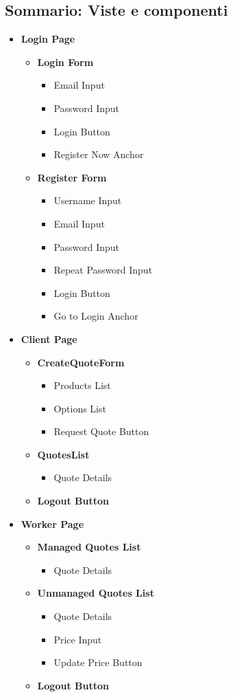 \documentclass[a4paper, 12pt]{article}
\begin{document}
\subsection{Sommario: Viste e componenti}
\begin{itemize}
	\item \textbf{Login Page}
	\begin{itemize}
		\item \textbf{Login Form}
		\begin{itemize}
			\item Email Input
			\item Password Input
			\item Login Button
			\item Register Now Anchor
		\end{itemize}
		\item \textbf{Register Form}
		\begin{itemize}
			\item Username Input
			\item Email Input
			\item Password Input
			\item Repeat Password Input
			\item Login Button
			\item Go to Login Anchor
		\end{itemize}
	\end{itemize}
	\item \textbf{Client Page}
	\begin{itemize}
		\item \textbf{CreateQuoteForm}
		\begin{itemize}
			\item Products List
			\item Options List
			\item Request Quote Button
		\end{itemize}
		\item \textbf{QuotesList}
		\begin{itemize}
			\item Quote Details
		\end{itemize}
		\item \textbf{Logout Button}
	\end{itemize}
	\item \textbf{Worker Page}
	\begin{itemize}
	\item \textbf{Managed Quotes List}
	\begin{itemize}
		\item Quote Details
	\end{itemize}
	\item \textbf{Unmanaged Quotes List}
	\begin{itemize}
		\item Quote Details
		\item Price Input
		\item Update Price Button
	\end{itemize}
		\item \textbf{Logout Button}
	\end{itemize}
\end{itemize}
\end{document}
